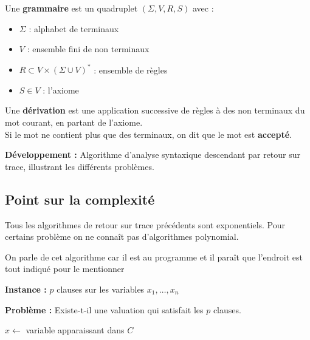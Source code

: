 \begin{definition}
	Une \textbf{grammaire} est un quadruplet $(\Sigma, V, R, S)$ avec :
	\begin{itemize}[label = $\bullet$]
		\item $\Sigma$ : alphabet de terminaux
		\item $V$ : ensemble fini de non terminaux
		\item $R \subset V \times (\Sigma \cup V)^*$ : ensemble de règles
		\item $S \in V$ : l'axiome
	\end{itemize}
	Une \textbf{dérivation} est une application successive de règles à des non terminaux du mot courant, en partant de l'axiome.\\
	Si le mot ne contient plus que des terminaux, on dit que le mot est \textbf{accepté}.
\end{definition}

\textbf{Développement :} Algorithme d'analyse syntaxique descendant par retour sur trace, illustrant les différents problèmes.

\subsection{Point sur la complexité}

Tous les algorithmes de retour sur trace précédents sont exponentiels. Pour certains problème on ne connaît pas d'algorithmes polynomial.

\begin{com}
	On parle de cet algorithme car il est au programme et il paraît que l'endroit est tout indiqué pour le mentionner
\end{com}

\begin{definition}[SAT]\enspace
	
	\textbf{Instance :} $p$ clauses sur les variables $x_1, \dots, x_n$
	
	\textbf{Problème :} Existe-t-il une valuation qui satisfait les $p$ clauses.
\end{definition}

\begin{algorithm}[H]
	\caption{$Quine(C)$}
		{}
		{}
	$x \gets $ variable apparaissant dans $C$\\
		{}
		{}
\end{algorithm}

